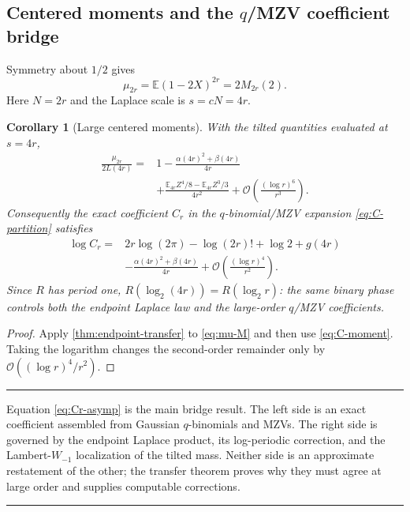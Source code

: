 \documentclass[11pt,oneside]{article}
\newtheorem{corollary}[theorem]{Corollary}
\theoremstyle{definition}
\theoremstyle{remark}
\newcommand{\E}{\mathbb E}
\newcommand{\bigO}{\mathcal O}
\newenvironment{boxedremark}{%
  \par\smallskip\noindent\begin{center}\begin{minipage}{0.94\textwidth}%
  \color{black}\hrule\vspace{0.6em}\small
}{%
  \vspace{0.6em}\hrule\end{minipage}\end{center}\smallskip
}
\begin{document}
\subsection{Centered moments and the $q$/MZV coefficient bridge}

Symmetry about $1/2$ gives
\begin{equation}\label{eq:mu-M}
 \mu_{2r}=\E(1-2X)^{2r}=2M_{2r}(2).
\end{equation}
Here $N=2r$ and the Laplace scale is $s=cN=4r$.

\begin{corollary}[Large centered moments]\label{cor:centered-moments}
With the tilted quantities evaluated at $s=4r$,
\begin{align}
 \frac{\mu_{2r}}{2L(4r)}={}&
 1-\frac{\alpha(4r)^2+\beta(4r)}{4r}\nonumber\\
 &+\frac{\E_{4r}Z^4/8-\E_{4r}Z^3/3}{4r^2}
 +\bigO\!\left(\frac{(\log r)^6}{r^3}\right).
 \label{eq:mu-transfer}
\end{align}
Consequently the exact coefficient $C_r$ in the $q$-binomial/MZV expansion
\cref{eq:C-partition} satisfies
\begin{equation}\label{eq:Cr-asymp}
 \boxed{\begin{aligned}
 \log C_r={}&2r\log(2\pi)-\log(2r)!+\log2+g(4r)\\
 &-\frac{\alpha(4r)^2+\beta(4r)}{4r}
 +\bigO\!\left(\frac{(\log r)^4}{r^2}\right).
 \end{aligned}}
\end{equation}
Since $R$ has period one,
$R(\log_2(4r))=R(\log_2r)$: the same binary phase controls both the endpoint
Laplace law and the large-order $q$/MZV coefficients.
\end{corollary}

\begin{proof}
Apply \cref{thm:endpoint-transfer} to \cref{eq:mu-M} and then use
\cref{eq:C-moment}.  Taking the logarithm changes the second-order remainder
only by $\bigO((\log r)^4/r^2)$.
\end{proof}

\begin{boxedremark}
Equation \cref{eq:Cr-asymp} is the main bridge result.  The left side is an
exact coefficient assembled from Gaussian $q$-binomials and MZVs.  The right
side is governed by the endpoint Laplace product, its log-periodic correction,
and the Lambert-$W_{-1}$ localization of the tilted mass.  Neither side is an
approximate restatement of the other; the transfer theorem proves why they
must agree at large order and supplies computable corrections.
\end{boxedremark}
\end{document}
